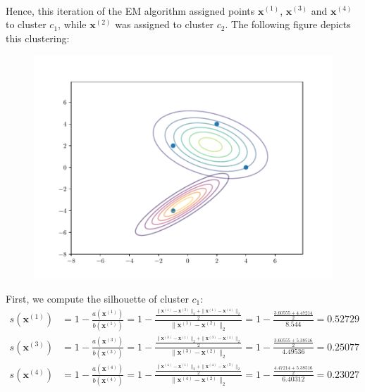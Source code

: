 \documentclass{exam}
\begin{document}
\begin{questions}
\begin{itemize}
\begin{align*}
            \end{align*}
            Hence, this iteration of the EM algorithm assigned points $\textbf{x}^{(1)}$, $\textbf{x}^{(3)}$ and $\textbf{x}^{(4)}$ to cluster $c_1$, while $\textbf{x}^{(2)}$ was assigned to cluster $c_2$. The following figure depicts this clustering:
            \begin{figure}[H]
                \centering
                \includegraphics[scale = 0.75]{EM_clusters.pdf}
            \end{figure}
        \end{itemize}
        \item First, we compute the silhouette of cluster $c_1$:
            \begin{align*}
                s(\textbf{x}^{(1)}) &= 1 - \frac{a(\textbf{x}^{(1)})}{b(\textbf{x}^{(1)})} = 1 - \frac{\frac{\|\textbf{x}^{(1)} - \textbf{x}^{(3)}\|_2 + \|\textbf{x}^{(1)} - \textbf{x}^{(4)}\|_2}{2}}{\|\textbf{x}^{(1)} - \textbf{x}^{(2)}\|_2} = 1 - \frac{\frac{ 3.60555 + 4.47214}{2}}{8.544} = 0.52729 \\
                s(\textbf{x}^{(3)}) &= 1 - \frac{a(\textbf{x}^{(3)})}{b(\textbf{x}^{(3)})} = 1 - \frac{\frac{\|\textbf{x}^{(3)} - \textbf{x}^{(1)}\|_2 + \|\textbf{x}^{(3)} - \textbf{x}^{(4)}\|_2}{2}}{\|\textbf{x}^{(3)} - \textbf{x}^{(2)}\|_2} = 1 - \frac{\frac{ 3.60555 + 5.38516}{2}}{4.49536} = 0.25077 \\
                s(\textbf{x}^{(4)}) &= 1 - \frac{a(\textbf{x}^{(4)})}{b(\textbf{x}^{(4)})} = 1 - \frac{\frac{\|\textbf{x}^{(4)} - \textbf{x}^{(1)}\|_2 + \|\textbf{x}^{(4)} - \textbf{x}^{(3)}\|_2}{2}}{\|\textbf{x}^{(4)} - \textbf{x}^{(2)}\|_2} = 1 - \frac{\frac{4.47214 + 5.38516}{2}}{6.40312} = 0.23027 \\

\end{align*}
\end{questions}
\end{document}
